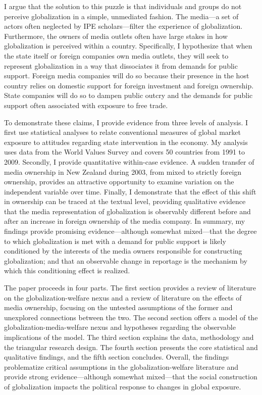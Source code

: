 \documentclass[12pt]{report}
\begin{document}
	I argue that the solution to this puzzle is that individuals and groups do not perceive
	globalization in a simple, unmediated fashion. The media---a set of actors often neglected by
	IPE scholars---filter the experience of globalization. Furthermore, the owners of media outlets
	often have large stakes in how globalization is perceived within a country. Specifically, I
	hypothesize that when the state itself or foreign companies own media outlets, they will seek to
	represent globalization in a way that dissociates it from demands for public support. Foreign
	media companies will do so because their presence in the host country relies on domestic support
	for foreign investment and foreign ownership. State companies will do so to dampen public outcry
	and the demands for public support often associated with exposure to free trade.

	To demonstrate these claims, I provide evidence from three levels of analysis. I first use
	statistical analyses to relate conventional measures of global market exposure to attitudes
	regarding state intervention in the economy. My analysis uses data from the World Values Survey
	and covers 50 countries from 1991 to 2009. Secondly, I provide quantitative within-case
	evidence. A sudden transfer of media ownership in New Zealand during 2003, from mixed to
	strictly foreign ownership, provides an attractive opportunity to examine variation on the
	independent variable over time. Finally, I demonstrate that the effect of this shift in
	ownership can be traced at the textual level, providing qualitative evidence that the media
	representation of globalization is observably different before and after an increase in foreign
	ownership of the media company. In summary, my findings provide promising evidence---although
	somewhat mixed---that the degree to which globalization is met with a demand for public support
	is likely conditioned by the interests of the media owners responsible for constructing
	globalization; and that an observable change in reportage is the mechanism by which this
	conditioning effect is realized.

The paper proceeds in four parts. The first section provides a review of literature on the
globalization-welfare nexus and a review of literature on the effects of media ownership, focusing
on the untested assumptions of the former and unexplored connections between the two. The second
section offers a model of the globalization-media-welfare nexus and hypotheses regarding the
observable implications of the model. The third section explains the data, methodology and the
triangular research design. The fourth section presents the core statistical and qualitative
findings, and the fifth section concludes. Overall, the findings problematize critical assumptions
in the globalization-welfare literature and provide strong evidence---although somewhat mixed---that
the social construction of globalization impacts the political response to changes in global
exposure.
\end{document}
